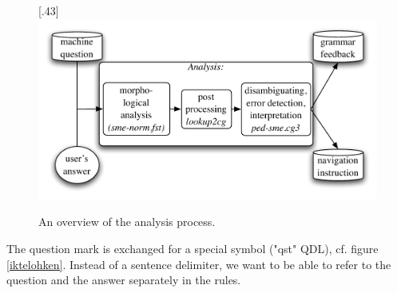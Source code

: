 \documentclass[11pt]{article}
\begin{document}
\begin{figure}[htbp]
\begin{center}
\scalebox{.48}[.43]{\includegraphics{presentation/img/qa2.pdf}}
\caption{An overview of the analysis process.}
\label{qasystem}
\end{center}
\end{figure}

The question mark is exchanged for a special symbol ("qst" QDL), cf. figure \ref{iktelohken}. Instead of a sentence delimiter, we want to be able to refer to the question and the answer separately in the rules.
\end{document}
